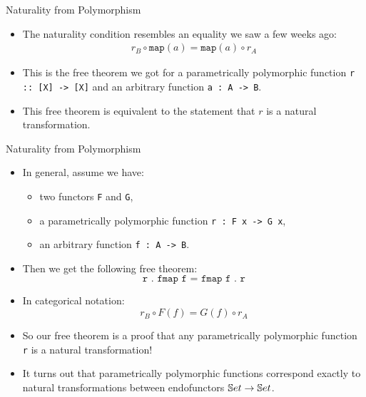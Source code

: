 \begin{frame}{Naturality from Polymorphism}
	\begin{itemize}
		\item The naturality condition resembles an equality we saw a few weeks ago:
		\begin{align*}
			r_B \circ \texttt{map}(a) = \texttt{map}(a) \circ r_A
		\end{align*}
		\pause \item This is the free theorem we got for a parametrically polymorphic function \texttt{r :: [X] -> [X]} and an arbitrary function \texttt{a : A -> B}.
		\pause \item This free theorem is equivalent to the statement that $r$ is a natural transformation.
	\end{itemize}
\end{frame}
\begin{frame}{Naturality from Polymorphism}
    \begin{itemize}
      \item In general, assume we have:
      \begin{itemize}
        \pause\item two functors \texttt{F} and \texttt{G},
        \pause\item a parametrically polymorphic function \texttt{r : F x -> G x},
        \pause\item an arbitrary function \texttt{f : A -> B}.
      \end{itemize}
      \pause\item Then we get the following free theorem:
      \begin{equation*}
       \texttt{r . fmap f = fmap f . r}
      \end{equation*}
      \vspace{-18pt}
      \pause\item In categorical notation:
      \begin{equation*}
        r_B \circ F(f) = G(f) \circ r_A
      \end{equation*}
      \vspace{-18pt}
      \pause\item So our free theorem is a proof that any parametrically polymorphic function \texttt{r} is a natural transformation!
      \pause\item It turns out that parametrically polymorphic functions correspond exactly to natural transformations between endofunctors $\mathbb{S} et \to \mathbb{S} et$.
    \end{itemize}
\end{frame}